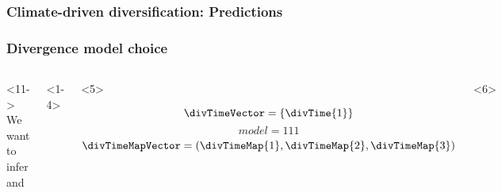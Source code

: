 \begin{frame}
    \frametitle<1-4>{Climate-driven diversification: Predictions}
    \frametitle<5->{Divergence model choice}

    \begin{columns}[t]


        \begin{uncoverenv}<11->
            We want to infer \textcolor{blue}{\divModel{}} and
            \textcolor{blue}{\divTimeMapVector} \\
        \end{uncoverenv}

        \vspace{4mm}
        \begin{onlyenv}<1-4>
            \begin{minipage}[c][0.5\textheight][c]{\linewidth}
            \end{minipage}
        \end{onlyenv}
        \begin{onlyenv}<5>
            \begin{minipage}[c][0.5\textheight][c]{\linewidth}
                \begin{displaybox}[0.95\linewidth]
                    \begin{minipage}[c][0.45\textheight][c]{0.95\linewidth}
                        \[
                            \divTimeVector = \{\divTime{1}\}
                        \]\vspace{0mm}
                        \[
                            model = 111
                        \]\vspace{0mm}
                        \[
                            \divTimeMapVector = (\divTimeMap{1},\divTimeMap{2},\divTimeMap{3})
                        \]\vspace{0mm}
                    \end{minipage}
                \end{displaybox}
            \end{minipage}
        \end{onlyenv}
        \begin{onlyenv}<6>
            \begin{minipage}[c][0.5\textheight][c]{\linewidth}
                \begin{displaybox}[0.95\linewidth]

\end{displaybox}
\end{minipage}
\end{onlyenv}
\end{columns}
\end{frame}
